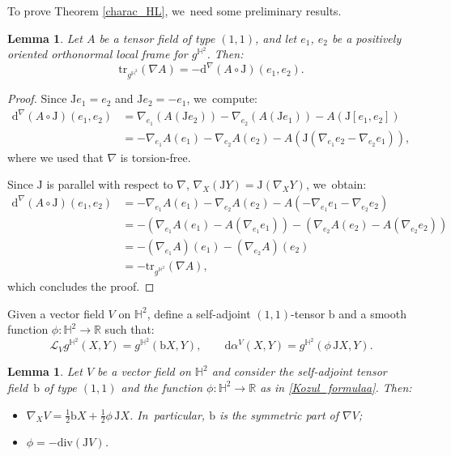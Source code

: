 \documentclass[JEP,XML,SOM,Unicode,NoEqCountersInSection, NoFloatCountersInSection,published]{cedram}
\theoremstyle{plain}
\newtheorem{lemma}[cor]{Lemma}
\theoremstyle{definition}
\begin{document}
To prove Theorem \ref{charac_HL}, we~need some preliminary results.

\begin{lemma}\label{techniqual_computation}
Let \(A \) be a tensor field of type \((1,1) \), and let \(e_1 \), \(e_2 \) be a positively oriented orthonormal local frame for \(g^{\mathbb{H}^2} \). Then:
\[
\mathrm{tr}_{g^{\mathbb{H}^2}}(\nabla A) = -\mathrm{d}^{\nabla}(A \circ \mathrm{J})(e_1,e_2).
\]
\end{lemma}

\begin{proof}
Since \(\mathrm{J}e_1 = e_2 \) and \(\mathrm{J}e_2 = -e_1 \), we~compute:
\begin{align*}
\mathrm{d}^{\nabla}(A \circ \mathrm{J})(e_1,e_2)
&= \nabla_{e_1} (A(\mathrm{J}e_2)) - \nabla_{e_2} (A(\mathrm{J}e_1)) - A(\mathrm{J}[e_1, e_2]) \\
&= -\nabla_{e_1} A(e_1) - \nabla_{e_2} A(e_2) - A(\mathrm{J}(\nabla_{e_1}e_2 - \nabla_{e_2}e_1)),
\end{align*}
where we used that \(\nabla \) is torsion-free.

Since \(\mathrm{J} \) is parallel with respect to \(\nabla \), \ie \(\nabla_X(\mathrm{J}Y) = \mathrm{J}(\nabla_X Y) \), we~obtain:
\begin{align*}
\mathrm{d}^{\nabla}(A \circ \mathrm{J})(e_1,e_2)
&= -\nabla_{e_1} A(e_1) - \nabla_{e_2} A(e_2) - A(-\nabla_{e_1}e_1 - \nabla_{e_2}e_2) \\
&= -\left(\nabla_{e_1} A(e_1) - A(\nabla_{e_1} e_1) \right) - \left(\nabla_{e_2} A(e_2) - A(\nabla_{e_2} e_2) \right) \\
&= -(\nabla_{e_1} A)(e_1) - (\nabla_{e_2} A)(e_2) \\
&= -\mathrm{tr}_{g^{\mathbb{H}^2}}(\nabla A),
\end{align*}
which concludes the proof.
\end{proof}

Given a vector field $V$ on $\mathbb{H}^2$, define a self-adjoint $(1,1)$-tensor $\mathrm{b}$ and a smooth function $\phi:\mathbb{H}^2\to\mathbb{R}$ such that:
\begin{equation}\label{Kozul_formulaa}
\mathcal{L}_Vg^{\mathbb{H}^2}(X,Y)=g^{\mathbb{H}^2}(\mathrm{b} X,Y),
\qquad
\mathrm{d}\alpha^V(X,Y)=g^{\mathbb{H}^2}(\phi\, \mathrm{J} X,Y).
\end{equation}

\begin{lemma}\label{Kozul_formula}
Let $V$ be a vector field on $\mathbb{H}^2$ and consider the self-adjoint tensor field~$\mathrm{b}$ of type $(1,1)$ and the function $\phi:\mathbb{H}^2\to \mathbb{R}$ as in \eqref{Kozul_formulaa}. Then:
\begin{itemize}
\item $\nabla_X V = \frac{1}{2} \mathrm{b} X + \frac{1}{2} \phi\, \mathrm{J} X$. In~particular, $\mathrm{b}$ is the symmetric part of $\nabla V$;
\item $\phi = -\mathrm{div}(\mathrm{J} V)$.
\end{itemize}

\end{lemma}
\end{document}
